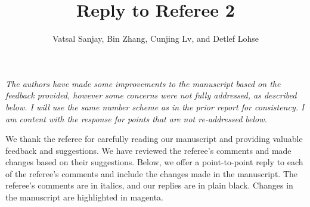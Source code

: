 \documentclass[]{article}
\title{Reply to Referee 2}
\author{Vatsal Sanjay, Bin Zhang, Cunjing Lv, and Detlef Lohse}
\date{}
\begin{document}
	
\maketitle
	
\textit{The authors have made some improvements to the manuscript based on the feedback provided, however some concerns were not fully addressed, as described below. I will use the same number scheme as in the prior report for consistency. I am content with the response for points that are not re-addressed below.}

We thank the referee for carefully reading our manuscript and providing valuable feedback and suggestions. We have reviewed the referee's comments and made changes based on their suggestions. Below, we offer a point-to-point reply to each of the referee's comments and include the changes made in the manuscript. The referee's comments are in italics, and our replies are in plain black. Changes in the manuscript are highlighted in magenta.
\end{document}
